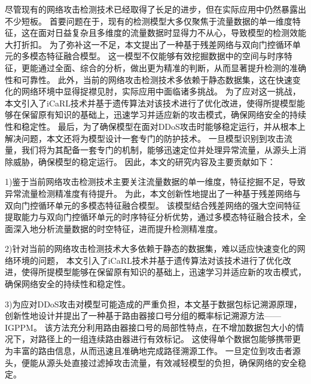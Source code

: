 尽管现有的网络攻击检测技术已经取得了长足的进步，但在实际应用中仍然暴露出不少短板。
首要问题在于，现有的检测模型大多仅聚焦于流量数据的单一维度特征，这在面对日益复杂且多维度的流量数据时显得力不从心，导致模型的检测效能大打折扣。
为了弥补这一不足，本文提出了一种基于残差网络与双向门控循环单元的多模态特征融合模型。
这一模型不仅能够有效挖掘数据中的空间与时序特征，更能通过全面、综合的分析，做出更为精准的判断，从而显著提升检测的准确性和可靠性。
此外，当前的网络攻击检测技术多依赖于静态数据集，这在快速变化的网络环境中显得捉襟见肘，实际应用中面临诸多挑战。
为了应对这一挑战，本文引入了iCaRL技术并基于遗传算法对该技术进行了优化改进，使得所提模型能够在保留原有知识的基础上，迅速学习并适应新的攻击模式，确保网络安全的持续性和稳定性。
最后，为了确保模型在面对DDoS攻击时能够稳定运行，并从根本上解决问题，本文还将为模型设计一套专门的防护技术。
一旦模型识别到攻击流量，我们将为其配备一套专门的机制，能够迅速定位并处理异常流量，从源头上消除威胁，确保模型的稳定运行。
因此，本文的研究内容及主要贡献如下：\par

1)鉴于当前网络攻击检测技术主要关注流量数据的单一维度，特征挖掘不足，导致异常流量检测精准度有待提升。
为此，本文创新性地提出了一种基于残差网络与双向门控循环单元的多模态特征融合模型。
该模型结合残差网络的强大空间特征提取能力与双向门控循环单元的时序特征分析优势，通过多模态特征融合技术，全面深入地分析流量数据的时空特征，进而提升检测精准度。\par

2)针对当前的网络攻击检测技术大多依赖于静态的数据集，难以适应快速变化的网络环境的问题，
本文引入了iCaRL技术并基于遗传算法对该技术进行了优化改进，使得所提模型能够在保留原有知识的基础上，迅速学习并适应新的攻击模式，确保网络安全的持续性和稳定性。\par

3)为应对DDoS攻击对模型可能造成的严重负担，本文基于数据包标记溯源原理，创新性地设计并提出了一种基于路由器接口号分组的概率标记溯源方法——IGPPM。
该方法充分利用路由器接口号的局部性特点，在不增加数据包大小的情况下，对路径上的一组连续路由器进行有效标记。             
这使得单个数据包能够携带更为丰富的路由信息，从而迅速且准确地完成路径溯源工作。
一旦定位到攻击者源头，便能从源头处直接过滤掉攻击流量，有效减轻模型的负担，确保网络的安全稳定。\par

